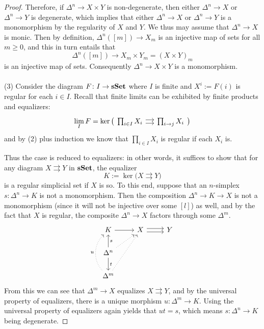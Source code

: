 \documentclass[a4paper,11pt,openany]{scrartcl}
\begin{document}
\begin{proof}
Therefore, if $\Delta^n\to X\times Y$ is non-degenerate, then either $\Delta^n\to X$ or $\Delta^n\to Y$ is degenerate, which implies that either $\Delta^n\to X$ or $\Delta^n\to Y$ is a monomorphism by the regularity of $X$ and $Y$. We thus may assume that $\Delta^n\to X$ is monic. Then by definition, $\Delta^n([m])\to X_m$ is an injective map of sets for all $m\geqslant 0$, and this in turn entails that
\[
\Delta^n([m])\to X_m\times Y_m=(X\times Y)_m
\]
is an injective map of sets. Consequently $\Delta^n\to X\times Y$ is a monomorphism.\\
\\
(3) Consider the diagram $F\colon I\to\operatorname{\mathbf{sSet}}$ where $I$ is finite and $X^i:=F(i)$ is regular for each $i\in I$. Recall that finite limits can be exhibited by finite products and equalizers:
\[
\lim_IF=\ker\big(
\begin{tikzcd}[sep=small]
\prod_{i\in I}X_i\arrow[r,shift right]\arrow[r,shift left]&\prod_{i\to j}X_i
\end{tikzcd}\big)
\]
and by (2) plus induction we know that $\prod_{i\in I}X_i$ is regular if each $X_i$ is. 

Thus the case is reduced to equalizers: in other words, it suffices to show that for any diagram $X\rightrightarrows Y$ in $\operatorname{\mathbf{sSet}}$, the equalizer
\[
K:=\ker\big(X\rightrightarrows Y\big)
\]
is a regular simplicial set if $X$ is so. To this end, suppose that an $n$-simplex $s\colon\Delta^n\to K$ is not a monomorphism. Then the composition $\Delta^n\to K\to X$ is not a monomorphism (since it will not be injective over some $[l]$) as well, and by the fact that $X$ is regular, the composite $\Delta^n\to X$ factors through some $\Delta^m$.
\[
\begin{tikzcd}
K\arrow[r]& X\arrow[r,shift right]\arrow[r,shift left]& Y\\
\Delta^n\arrow[u,"s"']\arrow[ur,dotted]\arrow[d,"t"]&&\\
\Delta^m\arrow[uur,dotted]\arrow[uu,bend left=45,dotted,"u"]&&
\end{tikzcd}
\]
From this we can see that $\Delta^m\to X$ equalizes $X\rightrightarrows Y$, and by the universal property of equalizers, there is a unique morphism $u\colon\Delta^m\to K$. Using the universal property of equalizers again yields that $ut=s$, which means $s\colon\Delta^n\to K$ being degenerate.
\end{proof}
\end{document}
